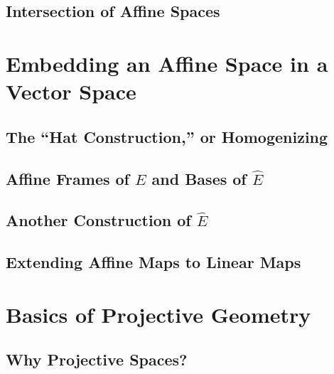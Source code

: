 \documentclass[a4paper]{article}
\begin{document}
\subsection{ Intersection of Affine Spaces} %


\newpage
\section{Embedding an Affine Space in a Vector Space}
\subsection{ The ``Hat Construction,'' or Homogenizing} %

\subsection{ Affine Frames of $E$ and Bases of $\hat{E}$} %

\subsection{ Another Construction of $\hat{E}$} %

\subsection{ Extending Affine Maps to Linear Maps} %


\newpage
\section{Basics of Projective Geometry}
\subsection{ Why Projective Spaces?} %
\end{document}
